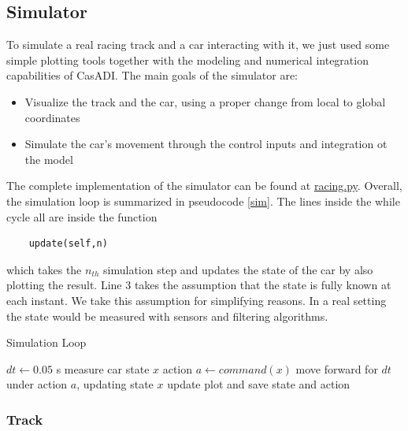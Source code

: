 \documentclass[a4paper, onecolumn, 11pt]{article}
\begin{document}
\subsection{Simulator}

To simulate a real racing track and a car interacting with it, we just used
some simple plotting tools together with the modeling and numerical integration
capabilities of CasADI. The main goals of the simulator are:
\begin{itemize}
    \item Visualize the track and the car, using a proper change from local to global coordinates
    \item Simulate the car's movement through the control inputs and integration ot the model
\end{itemize}
The complete implementation of the simulator can be found at
\href{https://github.com/neverorfrog/vehicle-control/blob/main/simulation/racing.py}{racing.py}.
Overall, the simulation loop is summarized in pseudocode \ref{sim}. The lines
inside the while cycle all are inside the function 
\begin{verbatim}
    update(self,n) 
\end{verbatim}
which takes the $n_{th}$ simulation step and updates the state of the car by
also plotting the result. Line 3 takes the assumption that the state is fully
known at each instant. We take this assumption for simplifying reasons. In a
real setting the state would be measured with sensors and filtering algorithms. 

\begin{algorithm}[h]
    \caption{Simulation Loop}\label{sim}
    \begin{algorithmic}[1]
        \State $dt \gets 0.05$ s 
        \State measure car state $x$
        \State action $a \gets command(x)$ 
        \State move forward for $dt$ under action $a$, updating state $x$
        \State update plot and save state and action
        \EndWhile
    \end{algorithmic}
\end{algorithm}

\subsubsection*{Track}
\label{subsec:track}
\end{document}
